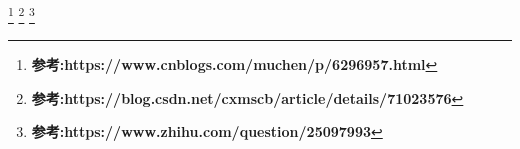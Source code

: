 \documentclass[a4paper,UTF8]{article}
\numberwithin{equation}{section}
\begin{document}
\begin{enumerate}[(1)]
\end{enumerate}
\footnote{\textbf{参考:https://www.cnblogs.com/muchen/p/6296957.html}}
\footnote{\textbf{参考:https://blog.csdn.net/cxmscb/article/details/71023576}}
\footnote{\textbf{参考:https://www.zhihu.com/question/25097993}}
\end{document}
